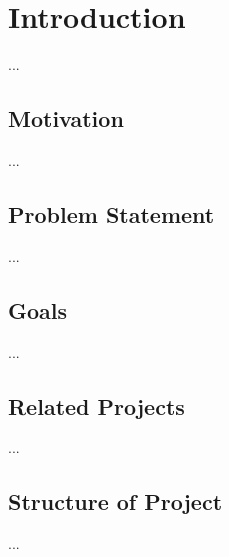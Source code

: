

\chapter{Introduction}

...

\section{Motivation}

...

\section{Problem Statement}

...


\section{Goals}

...

\section{Related Projects}

...

\section{Structure of Project}

...